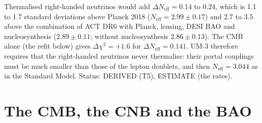 \documentclass[
  10pt,
]{article}
\begin{document}
Thermalised right-handed neutrinos would add
\(\Delta N_{\mathrm{eff}} = 0.14\) to \(0.24\), which is 1.1 to 1.7
standard deviations above Planck 2018
(\(N_{\mathrm{eff}} = 2.99 \pm 0.17\)) and 2.7 to 3.5 above the
combination of ACT DR6 with Planck, lensing, DESI BAO and
nucleosynthesis (\(2.89 \pm 0.11\); without nucleosynthesis
\(2.86 \pm 0.13\)). The CMB alone (the refit below) gives
\(\Delta\chi^2 = +1.6\) for \(\Delta N_{\mathrm{eff}} = 0.141\). UM-3
therefore requires that the right-handed neutrinos never thermalise:
their portal couplings must be much smaller than those of the lepton
doublets, and then \(N_{\mathrm{eff}} = 3.044\) as in the Standard
Model. Status: DERIVED (T5), ESTIMATE (the rates).

\hypertarget{the-cmb-the-cnb-and-the-bao}{%
\section{The CMB, the CNB and the
BAO}\label{the-cmb-the-cnb-and-the-bao}}
\end{document}
